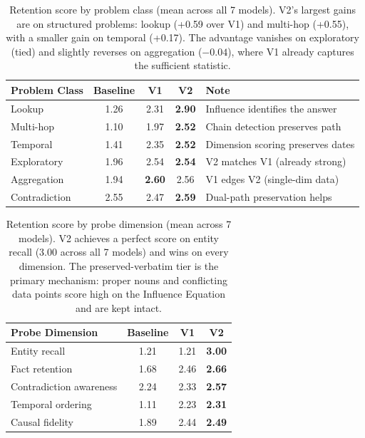 \documentclass[11pt,a4paper]{article}
\begin{document}
\begin{table}[H]
\centering
\begin{tabular}{@{}lcccl@{}}
\toprule
\textbf{Problem Class} & \textbf{Baseline} & \textbf{V1} & \textbf{V2} & \textbf{Note} \\
\midrule
Lookup & 1.26 & 2.31 & \textbf{2.90} & Influence identifies the answer \\
Multi-hop & 1.10 & 1.97 & \textbf{2.52} & Chain detection preserves path \\
Temporal & 1.41 & 2.35 & \textbf{2.52} & Dimension scoring preserves dates \\
Exploratory & 1.96 & 2.54 & \textbf{2.54} & V2 matches V1 (already strong) \\
Aggregation & 1.94 & \textbf{2.60} & 2.56 & V1 edges V2 (single-dim data) \\
Contradiction & 2.55 & 2.47 & \textbf{2.59} & Dual-path preservation helps \\
\bottomrule
\end{tabular}
\caption{Retention score by problem class (mean across all 7 models). V2's largest gains are on structured problems: lookup (+0.59 over V1) and multi-hop (+0.55), with a smaller gain on temporal (+0.17). The advantage vanishes on exploratory (tied) and slightly reverses on aggregation ($-0.04$), where V1 already captures the sufficient statistic.}
\label{tab:class}
\end{table}

\begin{table}[H]
\centering
\begin{tabular}{@{}lccc@{}}
\toprule
\textbf{Probe Dimension} & \textbf{Baseline} & \textbf{V1} & \textbf{V2} \\
\midrule
Entity recall & 1.21 & 1.21 & \textbf{3.00} \\
Fact retention & 1.68 & 2.46 & \textbf{2.66} \\
Contradiction awareness & 2.24 & 2.33 & \textbf{2.57} \\
Temporal ordering & 1.11 & 2.23 & \textbf{2.31} \\
Causal fidelity & 1.89 & 2.44 & \textbf{2.49} \\
\bottomrule
\end{tabular}
\caption{Retention score by probe dimension (mean across 7 models). V2 achieves a perfect score on entity recall (3.00 across all 7 models) and wins on every dimension. The preserved-verbatim tier is the primary mechanism: proper nouns and conflicting data points score high on the Influence Equation and are kept intact.}
\label{tab:dim}
\end{table}
\end{document}
